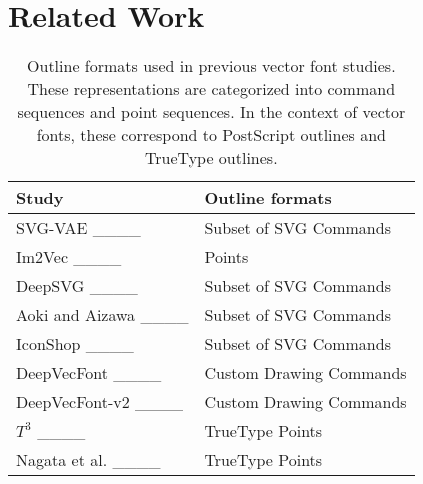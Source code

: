 \section{Related Work}
\begin{table}[!b]
    \renewcommand{\arraystretch}{1.3}
    \caption{
        \normalfont
        Outline formats used in previous vector font studies.
        These representations are categorized into command sequences and point sequences.
        In the context of vector fonts, these correspond to PostScript outlines and TrueType outlines.
    }
    \label{tab:study_outline_format}
    \centering
    \begin{tabular}{ll}
        \hline
        \textbf{Study}                              & \textbf{Outline formats} \\
        \hline
        SVG-VAE ____                 & Subset of SVG Commands   \\
        Im2Vec ____               & Points                   \\
        DeepSVG ____           & Subset of SVG Commands   \\
        Aoki and Aizawa ____          & Subset of SVG Commands   \\
        IconShop ____              & Subset of SVG Commands   \\
        DeepVecFont ____      & Custom Drawing Commands  \\
        DeepVecFont-v2 ____ & Custom Drawing Commands  \\
        $T^3$ ____             & TrueType Points          \\
        Nagata et al. ____      & TrueType Points          \\
        \hline
    \end{tabular}
\end{table}


